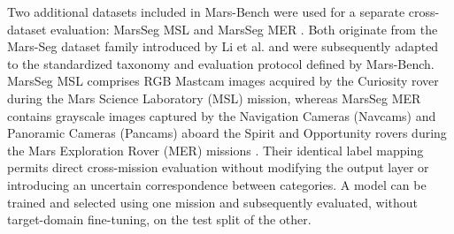 Two additional datasets included in Mars-Bench were used for a separate cross-dataset evaluation: MarsSeg MSL and MarsSeg MER \cite{purohit2025marsbench}. Both originate from the Mars-Seg dataset family introduced by Li et al. \cite{li2022covda} and were subsequently adapted to the standardized taxonomy and evaluation protocol defined by Mars-Bench. MarsSeg MSL comprises RGB Mastcam images acquired by the Curiosity rover during the Mars Science Laboratory (MSL) mission, whereas MarsSeg MER contains grayscale images captured by the Navigation Cameras (Navcams) and Panoramic Cameras (Pancams) aboard the Spirit and Opportunity rovers during the Mars Exploration Rover (MER) missions \cite{li2022covda}. Their identical label mapping permits direct cross-mission evaluation without modifying the output layer or introducing an uncertain correspondence between categories. A model can be trained and selected using one mission and subsequently evaluated, without target-domain fine-tuning, on the test split of the other.

\begin{table}[ht]
    \centering
    \vspace{5mm}
    \caption{Mars-Bench semantic segmentation datasets used in this work. The number of mask identifiers includes the \emph{Background} label.}
    \label{tab:mars-bench-datasets}
\end{table}

